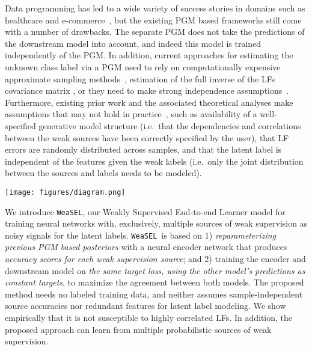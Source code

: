 \documentclass{article}
\newcommand{\weasel}{\texttt{WeaSEL}}\newcommand{\brackets}[1]{\left( #1 \right)}
\begin{document}
Data programming  has led to a wide variety of success stories in domains such as healthcare \cite{fries2019weakly,dunnmon2020cross} and e-commerce~\cite{Drybell}, but the existing PGM based frameworks still come with a number of drawbacks. 
The separate PGM does not take the predictions of the downstream model into account, and indeed this model is trained independently of the PGM.  
In addition, current approaches for estimating the unknown class label via a PGM need to rely on computationally expensive approximate sampling methods~\cite{DP}, estimation of the full inverse of the LFs covariance matrix \cite{Multitask}, or they need to make strong independence assumptions~\cite{triplets}.  
Furthermore, existing prior work and the associated theoretical analyses make assumptions that may not hold in practice~\cite{DP, Multitask, triplets}, such as availability of a  well-specified generative model structure (i.e.\ that the dependencies and correlations between the weak sources have been correctly specified by the user), that LF errors are randomly distributed across samples, and that the latent label is independent of the features given the weak labels (i.e.\ only the joint distribution between the sources and labels needs to be modeled).
\begin{figure*}
    \centering
\texttt{[image: figures/diagram.png]}
\vspace{-1mm}
    \caption{For a task with unobserved ground truth labels , given  sources of weak supervision  and training features , \weasel\ trains a downstream model   by maximizing the agreement of its predictions  with probabilistic labels  generated by reparameterizing the posterior of prior work with sample-dependent accuracy scores  produced by an encoder network .
    }
\label{fig:diagram}
\end{figure*}
 
We introduce \weasel, our Weakly Supervised End-to-end Learner model for training neural networks with, exclusively, multiple sources of weak supervision as noisy signals for the latent labels. \weasel\ is based on 1) \emph{reparameterizing previous PGM based posteriors} with a neural encoder network that produces \emph{accuracy scores for each weak supervision source}; and 2) training the encoder and downstream model on \emph{the same target loss, using the other model's predictions as constant targets}, to maximize the agreement between both models.
The proposed method needs no labeled training data, and neither assumes sample-independent source accuracies nor redundant features for latent label modeling. We show empirically that it is not susceptible to highly correlated LFs.
In addition, the proposed approach can learn from multiple probabilistic sources of weak supervision.
\end{document}
